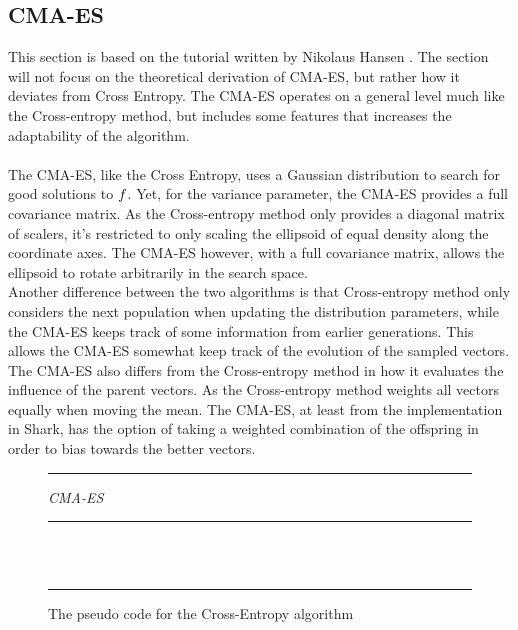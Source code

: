 \subsection{CMA-ES \label{CMAtheory}}


This section is based on the tutorial written by Nikolaus Hansen
\citep{hansen2011}. The section will not focus on the theoretical derivation
of CMA-ES, but rather how it deviates from Cross Entropy. 
The CMA-ES operates on a general level much like the Cross-entropy 
method, but includes some features that increases the adaptability 
of the algorithm.\\
\\
The CMA-ES, like the Cross Entropy, uses a Gaussian distribution to
search for good solutions to $f$. Yet, for the 
variance parameter, the CMA-ES provides a full covariance matrix.
As the Cross-entropy method only provides a diagonal matrix of scalers,
it's restricted to only scaling the ellipsoid of equal density along
the coordinate axes. The CMA-ES however, with a full covariance matrix,
allows the ellipsoid to rotate arbitrarily in the search space.\\
Another difference between the two algorithms is that 
Cross-entropy method only considers the next population when updating the
distribution parameters, while the CMA-ES keeps track of 
some information from earlier 
generations. This allows the CMA-ES somewhat keep track of the evolution 
of the sampled vectors.\\
The CMA-ES also differs from the Cross-entropy method in how it evaluates the influence 
of the parent vectors. As the Cross-entropy method weights all vectors equally when 
moving the mean. The CMA-ES, at least from the implementation in Shark, 
has the option of taking a weighted combination of the offspring in order
to bias towards the better vectors.

\begin{figure}[H]
\hrule
\vspace{0.2cm}
{\centering  \textit{CMA-ES}}
\vspace{0.2cm}
\hrule
\begin{algorithmic}
\\
\\
\Loop
{}
\EndLoop
\end{algorithmic}
\hrule
\caption{The pseudo code for the Cross-Entropy algorithm \label{fig:cmaCode}}
\end{figure}

